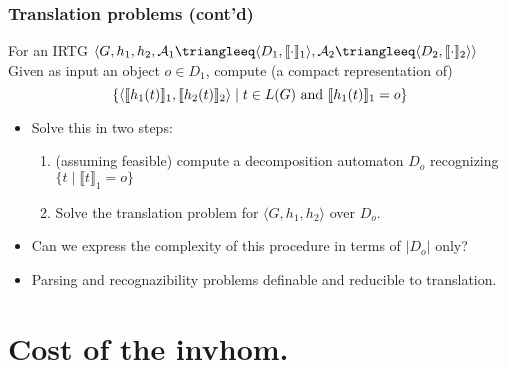\documentclass{beamer}
\begin{document}
\begin{frame}
  \frametitle{Translation problems (cont'd)}
  \begin{block}{For an IRTG $\langle G, h_1, h_2, \mathcal{A}_1 \triangleeq \langle D_1, \llbracket \cdot \rrbracket_1 \rangle , \mathcal{A}_2 \triangleeq \langle D_2, \llbracket \cdot \rrbracket_2 \rangle  \rangle$}
    Given as input an object $o \in D_1$, compute (a compact representation of)
    \[ \{ \langle \llbracket h_1(t) \rrbracket_1, \llbracket h_2(t) \rrbracket_2 \rangle \mid t \in L(G) \textnormal{ and } \llbracket h_1(t) \rrbracket_1 = o \} \]
  \end{block}
  \begin{itemize}
  \item Solve this in two steps:
    \begin{enumerate}
    \item (assuming feasible) compute a decomposition automaton $D_o$ recognizing $\{ t \mid \llbracket t \rrbracket_1 = o \}$
    \item Solve the translation problem for $\langle G, h_1, h_2 \rangle$ over $D_o$.
    \end{enumerate}
  \item  \alert{Can we express the complexity of this procedure in terms of $|D_o|$ only?}
  \item Parsing and recognazibility problems definable and reducible to translation.
  \end{itemize}  
\end{frame}

\section{Cost of the invhom.}
\end{document}
